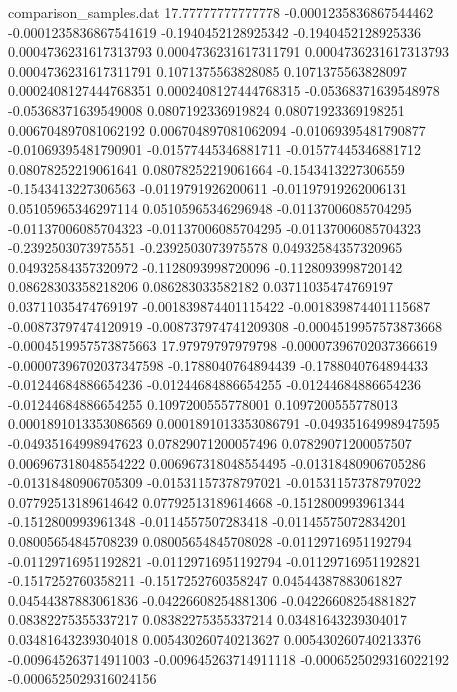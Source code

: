 \begin{filecontents}{comparison_samples.dat}
17.77777777777778   -0.0001235836867544462  -0.0001235836867541619  -0.1940452128925342    -0.1940452128925336    0.0004736231617313793  0.0004736231617311791  0.0004736231617313793  0.0004736231617311791  0.1071375563828085     0.1071375563828097     0.0002408127444768351   0.0002408127444768315   -0.05368371639548978   -0.05368371639549008   0.0807192336919824      0.08071923369198251     0.006704897081062192    0.006704897081062094    -0.01069395481790877    -0.01069395481790901    -0.01577445346881711    -0.01577445346881712    0.08078252219061641     0.08078252219061664     -0.1543413227306559     -0.1543413227306563     -0.0119791926200611    -0.01197919262006131   0.05105965346297114    0.05105965346296948    -0.01137006085704295    -0.01137006085704323    -0.01137006085704295    -0.01137006085704323    -0.2392503073975551    -0.2392503073975578    0.04932584357320965     0.04932584357320972     -0.1128093998720096    -0.1128093998720142    0.08628303358218206     0.086283033582182       0.03711035474769197     0.03711035474769197     -0.001839874401115422  -0.001839874401115687  -0.00873797474120919   -0.008737974741209308  -0.0004519957573873668  -0.0004519957573875663
17.97979797979798   -0.00007396702037366619 -0.00007396702037347598 -0.1788040764894439    -0.1788040764894433    -0.01244684886654236   -0.01244684886654255   -0.01244684886654236   -0.01244684886654255   0.1097200555778001     0.1097200555778013     0.0001891013353086569   0.0001891013353086791   -0.04935164998947595   -0.04935164998947623   0.07829071200057496     0.07829071200057507     0.006967318048554222    0.006967318048554495    -0.01318480906705286    -0.01318480906705309    -0.01531157378797021    -0.01531157378797022    0.07792513189614642     0.07792513189614668     -0.1512800993961344     -0.1512800993961348     -0.0114557507283418    -0.01145575072834201   0.08005654845708239    0.08005654845708028    -0.01129716951192794    -0.01129716951192821    -0.01129716951192794    -0.01129716951192821    -0.1517252760358211    -0.1517252760358247    0.04544387883061827     0.04544387883061836     -0.04226608254881306   -0.04226608254881827   0.08382275355337217     0.08382275355337214     0.03481643239304017     0.03481643239304018     0.005430260740213627   0.005430260740213376   -0.009645263714911003  -0.009645263714911118  -0.0006525029316022192  -0.0006525029316024156

\end{filecontents}
